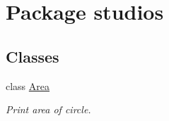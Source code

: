 \hypertarget{namespacestudios}{}\section{Package studios}
\label{namespacestudios}
\subsection*{Classes}
\begin{DoxyCompactItemize}
\item 
class \mbox{\hyperlink{classstudios_1_1_area}{Area}}
\begin{DoxyCompactList}\small\item\em Print area of circle. \end{DoxyCompactList}\end{DoxyCompactItemize}
